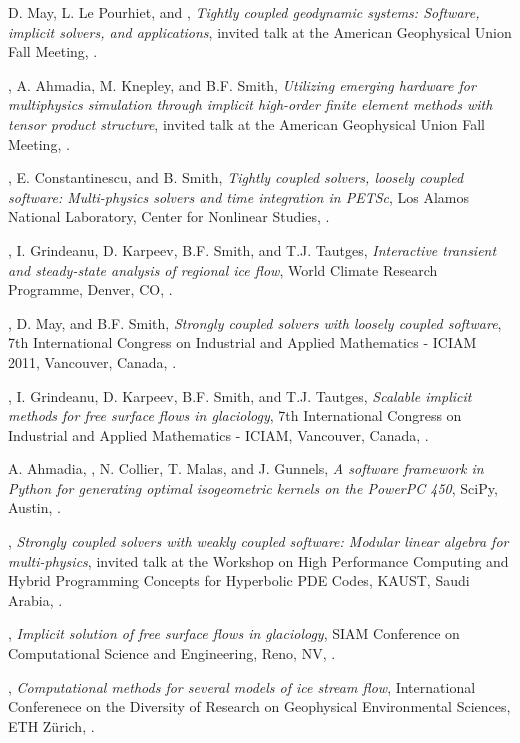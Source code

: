 \documentclass[10pt,letterpaper]{article}
\newcommand\ptitle[1]{\textit{#1}} %
\renewenvironment{itemize}{
  \begin{list}{}{
    \setlength{\leftmargin}{1.5em}
    \setlength{\itemsep}{0.25em}
    \setlength{\parskip}{0pt}
    \setlength{\parsep}{0.25em}
  }
}{
  \end{list}
}
\begin{document}
\begin{itemize}
\item D. May, L. Le Pourhiet, and {\JedBrown}, \ptitle{Tightly coupled geodynamic systems: Software, implicit solvers, and applications}, invited talk at the American Geophysical Union Fall Meeting, .
\item {\JedBrown}, A. Ahmadia, M. Knepley, and B.F. Smith, \ptitle{Utilizing emerging hardware for multiphysics simulation through implicit high-order finite element methods with tensor product structure}, invited talk at the American Geophysical Union Fall Meeting, .
\item {\JedBrown}, E. Constantinescu, and B. Smith, \ptitle{Tightly coupled solvers, loosely coupled software: Multi-physics solvers and time integration in PETSc}, Los Alamos National Laboratory, Center for Nonlinear Studies, .
\item {\JedBrown}, I. Grindeanu, D. Karpeev, B.F. Smith, and T.J. Tautges, \ptitle{Interactive transient and steady-state analysis of regional ice flow}, World Climate Research Programme, Denver, CO, .
\item {\JedBrown}, D. May, and B.F. Smith, \ptitle{Strongly coupled solvers with loosely coupled software}, 7th International Congress on Industrial and Applied Mathematics - ICIAM 2011, Vancouver, Canada, .
\item {\JedBrown}, I. Grindeanu, D. Karpeev, B.F. Smith, and T.J. Tautges, \ptitle{Scalable implicit methods for free surface flows in glaciology}, 7th International Congress on Industrial and Applied Mathematics - ICIAM, Vancouver, Canada, .
\item A. Ahmadia, {\JedBrown}, N. Collier, T. Malas, and J. Gunnels, \ptitle{A software framework in Python for generating optimal isogeometric kernels on the PowerPC 450}, SciPy, Austin, .
\item {\JedBrown}, \ptitle{Strongly coupled solvers with weakly coupled software: Modular linear algebra for multi-physics}, invited talk at the Workshop on High Performance Computing and Hybrid Programming Concepts for Hyperbolic PDE Codes, KAUST, Saudi Arabia, .
\item {\JedBrown}, \ptitle{Implicit solution of free surface flows in glaciology}, SIAM Conference on Computational Science and Engineering, Reno, NV, .
\item {\JedBrown}, \ptitle{Computational methods for several models of ice stream flow}, International Conferenece on the Diversity of Research on Geophysical Environmental Sciences, ETH Z\"urich, .

\end{itemize}
\end{document}
